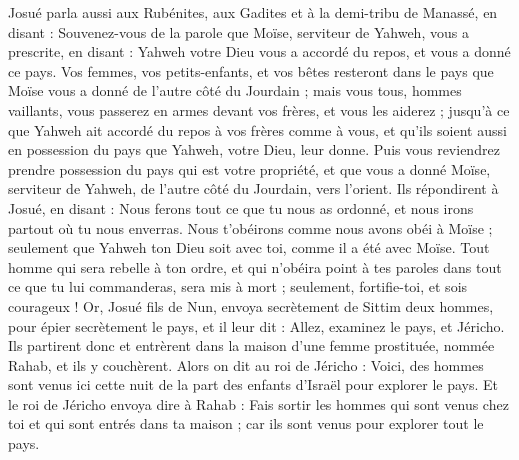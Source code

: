 \begin{multicols}{2}
Josué parla aussi aux Rubénites, aux Gadites et à la demi-tribu de Manassé, en disant :
Souvenez-vous de la parole que Moïse, serviteur de Yahweh, vous a prescrite, en disant : Yahweh votre Dieu vous a accordé du repos, et vous a donné ce pays.
Vos femmes, vos petits-enfants, et vos bêtes resteront dans le pays que Moïse vous a donné de l'autre côté du Jourdain ; mais vous tous, hommes vaillants, vous passerez en armes devant vos frères, et vous les aiderez ;
jusqu'à ce que Yahweh ait accordé du repos à vos frères comme à vous, et qu'ils soient aussi en possession du pays que Yahweh, votre Dieu, leur donne. Puis vous reviendrez prendre possession du pays qui est votre propriété, et que vous a donné Moïse, serviteur de Yahweh, de l'autre côté du Jourdain, vers l'orient.
Ils répondirent à Josué, en disant : Nous ferons tout ce que tu nous as ordonné, et nous irons partout où tu nous enverras.
Nous t'obéirons comme nous avons obéi à Moïse ; seulement que Yahweh ton Dieu soit avec toi, comme il a été avec Moïse.
Tout homme qui sera rebelle à ton ordre, et qui n'obéira point à tes paroles dans tout ce que tu lui commanderas, sera mis à mort ; seulement, fortifie-toi, et sois courageux !
\VerseOne{}Or, Josué fils de Nun, envoya secrètement de Sittim deux hommes, pour épier secrètement le pays, et il leur dit : Allez, examinez le pays, et Jéricho. Ils partirent donc et entrèrent dans la maison d'une femme prostituée, nommée Rahab, et ils y couchèrent.
Alors on dit au roi de Jéricho : Voici, des hommes sont venus ici cette nuit de la part des enfants d'Israël pour explorer le pays.
Et le roi de Jéricho envoya dire à Rahab : Fais sortir les hommes qui sont venus chez toi et qui sont entrés dans ta maison ; car ils sont venus pour explorer tout le pays.

\end{multicols}
